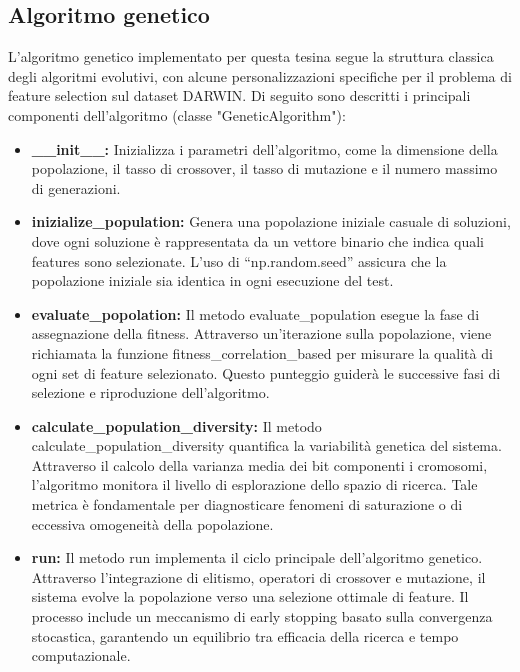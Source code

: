\documentclass[11pt,a4paper]{article}
\begin{document}
\subsection{Algoritmo genetico}
L'algoritmo genetico implementato per questa tesina segue la struttura classica degli algoritmi evolutivi, con alcune personalizzazioni specifiche per il problema di feature selection sul dataset DARWIN. 
Di seguito sono descritti i principali componenti dell'algoritmo (classe "GeneticAlgorithm"):
\begin{itemize}
  \item \textbf{\_\_init\_\_:} Inizializza i parametri dell'algoritmo, come la dimensione della popolazione, il tasso di crossover, il tasso di mutazione e il numero massimo di generazioni.
  \item \textbf{inizialize\_population:} Genera una popolazione iniziale casuale di soluzioni, dove ogni soluzione è rappresentata da un vettore binario che indica quali features sono selezionate. L'uso di ``np.random.seed'' assicura che la popolazione iniziale sia identica in ogni esecuzione del test.
  \item \textbf{evaluate\_popolation:} Il metodo evaluate\_population esegue la fase di assegnazione della fitness. Attraverso un'iterazione sulla popolazione, viene richiamata la funzione fitness\_correlation\_based per misurare la qualità di ogni set di feature selezionato. Questo punteggio guiderà le successive fasi di selezione e riproduzione dell'algoritmo.
  \item \textbf{calculate\_population\_diversity:} Il metodo calculate\_population\_diversity quantifica la variabilità genetica del sistema. Attraverso il calcolo della varianza media dei bit componenti i cromosomi, l'algoritmo monitora il livello di esplorazione dello spazio di ricerca. Tale metrica è fondamentale per diagnosticare fenomeni di saturazione o di eccessiva omogeneità della popolazione.
  \item \textbf{run:} Il metodo run implementa il ciclo principale dell'algoritmo genetico. Attraverso l'integrazione di elitismo, operatori di crossover e mutazione, il sistema evolve la popolazione verso una selezione ottimale di feature. Il processo include un meccanismo di early stopping basato sulla convergenza stocastica, garantendo un equilibrio tra efficacia della ricerca e tempo computazionale.
\end{itemize}
\end{document}
